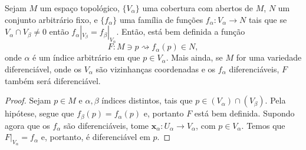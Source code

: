 \begin{lemma}
	\label{lem:definicao-local-global}
	Sejam $M$ um espaço topológico, $\{ V_{\alpha}\}$ uma cobertura com abertos de $M$, $N$  um conjunto arbitrário fixo, e $\{ f_{\alpha} \}$ uma família de funções $f_{\alpha}:V_{\alpha}\to N$ tais que se $V_{\alpha} \cap V_{\beta}\neq0$ então $f_{\alpha}|_{V_{\beta}}=f_{\beta}|_{V_{\alpha}}$. Então, está bem definida a função
	\begin{equation*}
		F:M  \ni p \rightsquigarrow f_{\alpha}(p) \in N,
	\end{equation*}
	onde $\alpha$ é um índice arbitrário em que $p \in V_{\alpha}$. Mais ainda, se $M$ for uma variedade diferenciável, onde os $V_{\alpha}$ são vizinhanças coordenadas e os $f_{\alpha}$ diferenciáveis, $F$ também será diferenciável.
	\begin{proof}

		Sejam $p \in M$ e $\alpha, \beta$ índices distintos, tais que $p \in(V_{\alpha})\cap (V_{\beta})$. Pela hipótese, segue que $f_{\beta}(p)=f_{\alpha}(p)$ e, portanto $F$ está bem definida.
		Supondo agora que os $f_{\alpha}$ são diferenciáveis, tome $\mathbf{x}_{\alpha}:U_{\alpha}\to V_{\alpha}$, com $p \in V_{\alpha}$. Temos que $F|_{V_{\alpha}}=f_{\alpha}$ e, portanto, é diferenciável em $p$.
	\end{proof}
\end{lemma}

